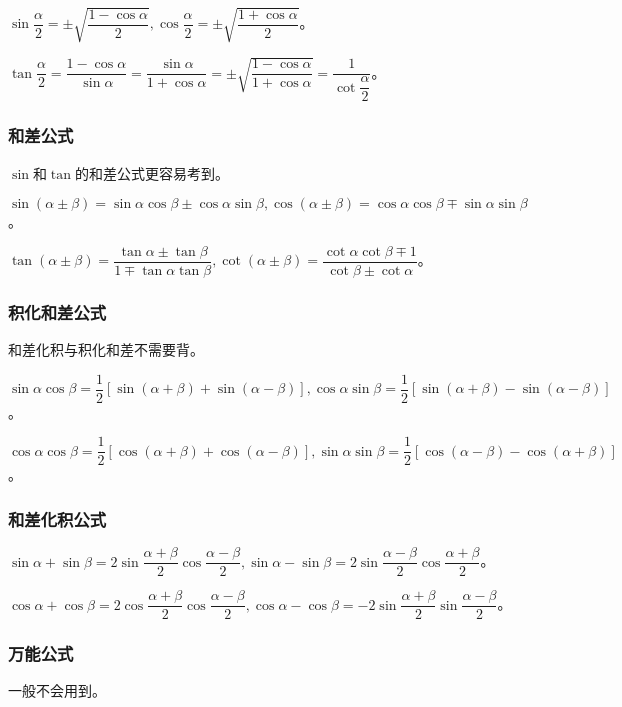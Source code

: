 \documentclass[UTF8, 12pt]{ctexart}
\begin{document}
$\sin\dfrac{\alpha}{2}=\pm\sqrt{\dfrac{1-\cos\alpha}{2}},\cos\dfrac{\alpha}{2}=\pm\sqrt{\dfrac{1+\cos\alpha}{2}}$。

$\tan\dfrac{\alpha}{2}=\dfrac{1-\cos\alpha}{\sin\alpha}=\dfrac{\sin\alpha}{1+\cos\alpha}=\pm\sqrt{\dfrac{1-\cos\alpha}{1+\cos\alpha}}=\dfrac{1}{\cot\dfrac{\alpha}{2}}$。

\subsubsection{和差公式}

$\sin$和$\tan$的和差公式更容易考到。

$\sin(\alpha\pm\beta)=\sin\alpha\cos\beta\pm\cos\alpha\sin\beta,\cos(\alpha\pm\beta)=\cos\alpha\cos\beta\mp\sin\alpha\sin\beta$。

$\tan(\alpha\pm\beta)=\dfrac{\tan\alpha\pm\tan\beta}{1\mp\tan\alpha\tan\beta},\cot(\alpha\pm\beta)=\dfrac{\cot\alpha\cot\beta\mp 1}{\cot\beta\pm\cot\alpha}$。

\subsubsection{积化和差公式}

和差化积与积化和差不需要背。

$\sin\alpha\cos\beta=\dfrac{1}{2}[\sin(\alpha+\beta)+\sin(\alpha-\beta)],\cos\alpha\sin\beta=\dfrac{1}{2}[\sin(\alpha+\beta)-\sin(\alpha-\beta)]$。

$\cos\alpha\cos\beta=\dfrac{1}{2}[\cos(\alpha+\beta)+\cos(\alpha-\beta)],\sin\alpha\sin\beta=\dfrac{1}{2}[\cos(\alpha-\beta)-\cos(\alpha+\beta)]$。

\subsubsection{和差化积公式}

$\sin\alpha+\sin\beta=2\sin\dfrac{\alpha+\beta}{2}\cos\dfrac{\alpha-\beta}{2},\sin\alpha-\sin\beta=2\sin\dfrac{\alpha-\beta}{2}\cos\dfrac{\alpha+\beta}{2}$。

$\cos\alpha+\cos\beta=2\cos\dfrac{\alpha+\beta}{2}\cos\dfrac{\alpha-\beta}{2},\cos\alpha-\cos\beta=-2\sin\dfrac{\alpha+\beta}{2}\sin\dfrac{\alpha-\beta}{2}$。

\subsubsection{万能公式}

一般不会用到。
\end{document}
